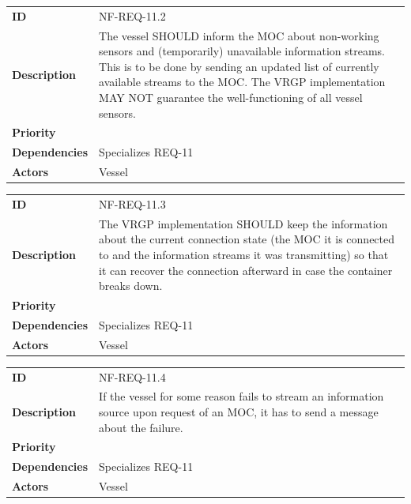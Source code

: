\begin{table}[H]
	\centering
	\begin{tabularx}{\textwidth}{ l X }
		\rowcolor[HTML]{E7E7E7}
		\textbf{ID} & NF-REQ-11.2 \\
		\textbf{Description} & The vessel SHOULD inform the MOC about non-working sensors and (temporarily) unavailable information streams. This is to be done by sending an updated list of currently available streams to the MOC. The VRGP implementation MAY NOT guarantee the well-functioning of all vessel sensors. \\
		\rowcolor[HTML]{E7E7E7}
		\textbf{Priority} & \prioavg \\
		\textbf{Dependencies} & Specializes REQ-11 \\
		\rowcolor[HTML]{E7E7E7}
		\textbf{Actors} & Vessel \\
	\end{tabularx}
	\label{table:nf-req-11.2}
\end{table}

\begin{table}[H]
	\centering
	\begin{tabularx}{\textwidth}{ l X }
		\rowcolor[HTML]{E7E7E7}
		\textbf{ID} & NF-REQ-11.3 \\
		\textbf{Description} & The VRGP implementation SHOULD keep the information about the current connection state (the MOC it is connected to and the information streams it was transmitting) so that it can recover the connection afterward in case the container breaks down. \\
		\rowcolor[HTML]{E7E7E7}
		\textbf{Priority} & \prioavg \\
		\textbf{Dependencies} & Specializes REQ-11 \\
		\rowcolor[HTML]{E7E7E7}
		\textbf{Actors} & Vessel \\
	\end{tabularx}
	\label{table:nf-req-11.3}
\end{table}

\begin{table}[H]
	\centering
	\begin{tabularx}{\textwidth}{ l X }
		\rowcolor[HTML]{E7E7E7}
		\textbf{ID} & NF-REQ-11.4 \\
		\textbf{Description} & If the vessel for some reason fails to stream an information source upon request of an MOC, it has to send a message about the failure. \\
		\rowcolor[HTML]{E7E7E7}
		\textbf{Priority} & \priohigh \\
		\textbf{Dependencies} & Specializes REQ-11 \\
		\rowcolor[HTML]{E7E7E7}
		\textbf{Actors} & Vessel \\
	\end{tabularx}
	\label{table:nf-req-11.4}
\end{table}

